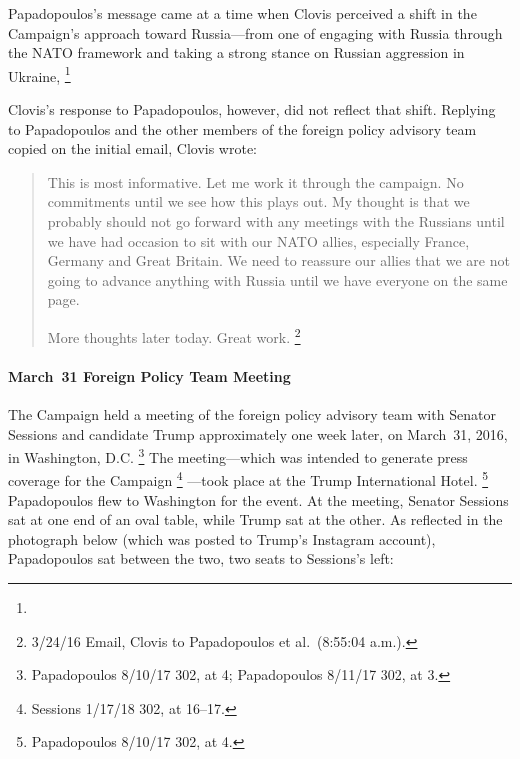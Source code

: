 Papadopoulos's message came at a time when Clovis perceived a shift in the Campaign's approach toward Russia---from one of engaging with Russia through the NATO framework and taking a strong stance on Russian aggression in Ukraine, %
\footnote{}

Clovis's response to Papadopoulos, however, did not reflect that shift.
Replying to Papadopoulos and the other members of the foreign policy advisory team copied on the initial email, Clovis wrote:

\begin{quote}
This is most informative.
Let me work it through the campaign.
No commitments until we see how this plays out.
My thought is that we probably should not go forward with any meetings with the Russians until we have had occasion to sit with our NATO allies, especially France, Germany and Great Britain.
We need to reassure our allies that we are not going to advance anything with Russia until we have everyone on the same page.

More thoughts later today.
Great work.%
\footnote{3/24/16 Email, Clovis to Papadopoulos et al.\ (8:55:04 a.m.).}
\end{quote}

\paragraph{March~31 Foreign Policy Team Meeting}

The Campaign held a meeting of the foreign policy advisory team with Senator Sessions and candidate Trump approximately one week later, on March~31, 2016, in Washington, D.C.%
\footnote{Papadopoulos 8/10/17 302, at 4; Papadopoulos 8/11/17 302, at 3.}
The meeting---which was intended to generate press coverage for the Campaign%
\footnote{Sessions 1/17/18 302, at 16--17.}%
---took place at the Trump International Hotel.%
\footnote{Papadopoulos 8/10/17 302, at 4.}
Papadopoulos flew to Washington for the event.
At the meeting, Senator Sessions sat at one end of an oval table, while Trump sat at the other.
As reflected in the photograph below (which was posted to Trump's Instagram account), Papadopoulos sat between the two, two seats to Sessions's left:

